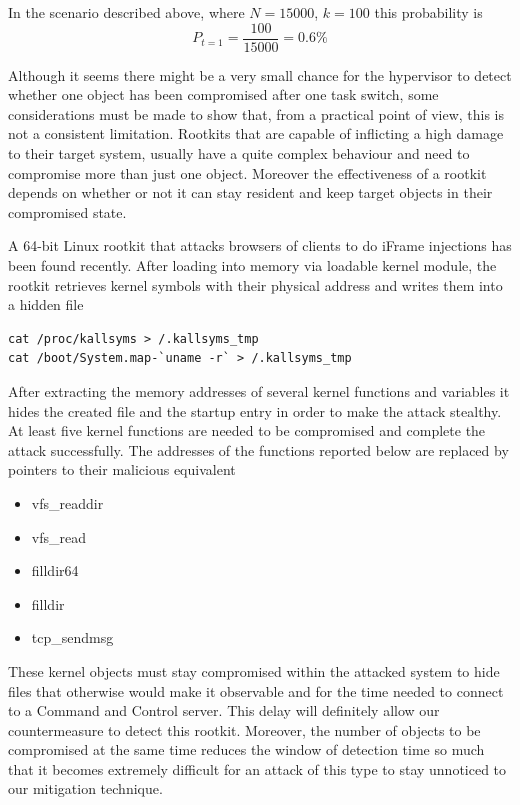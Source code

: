 In the scenario described above, where $N=15000$, $k=100$ this probability is
$$ P_{t=1} = \frac{100}{15000}=0.6\% $$


Although it seems there might be a very small chance for the hypervisor to detect whether one object has been compromised after one task switch, some considerations must be made to show that, from a practical point of view, this is not a consistent limitation.
Rootkits that are capable of inflicting a high damage to their target system, usually have a quite complex behaviour and need to compromise more than just one object. Moreover the effectiveness of a rootkit depends on whether or not it can stay resident and keep target objects in their compromised state.

 
A 64-bit Linux rootkit\cite{rootkit64} that attacks browsers of clients to do iFrame injections has been found recently. After loading into memory via loadable kernel module, the rootkit retrieves kernel symbols with their physical address and writes them into a hidden file

\begin{verbatim}
cat /proc/kallsyms > /.kallsyms_tmp 
cat /boot/System.map-`uname -r` > /.kallsyms_tmp
\end{verbatim}

After extracting the memory addresses of several kernel functions and variables it hides the created file and the startup entry in order to make the attack stealthy. At least five kernel functions are needed to be compromised and complete the attack successfully. The addresses of the functions reported below are replaced by pointers to their malicious equivalent \cite{rootkit64,rootkit64anal}

\begin{itemize}
\item vfs\_readdir 
\item vfs\_read 
\item filldir64 
\item filldir
\item tcp\_sendmsg
\end{itemize}

These kernel objects must stay compromised within the attacked system to hide files that otherwise would make it observable and for the time needed to connect to a Command and Control server. 
This delay will definitely allow our countermeasure to detect this rootkit. Moreover, the number of objects to be compromised at the same time reduces the window of detection time so much that it becomes extremely difficult for an attack of this type to stay unnoticed to our mitigation technique.



